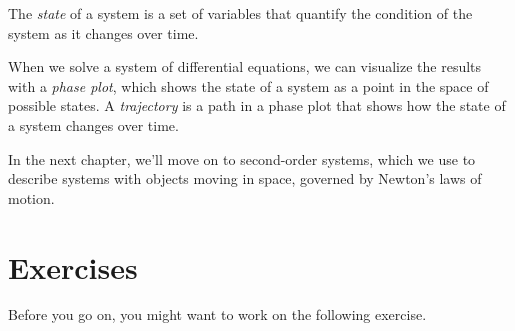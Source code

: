 \documentclass[../../book.tex]{subfiles}
\begin{document}
The \emph{state} of a system is a set of variables that quantify the condition of the system as it changes over time.

When we solve a system of differential equations, we can visualize the results with a \emph{phase plot}, which shows the state of a system as a point in the space of possible states.
A \emph{trajectory} is a path in a phase plot that shows how the state of a system changes over time.

In the next chapter, we'll move on to second-order systems, which we use to describe systems
with objects moving in space, governed by Newton's laws of motion.


\section{Exercises}

Before you go on, you might want to work on the following exercise.
\end{document}
